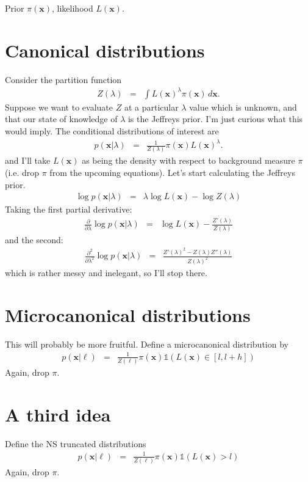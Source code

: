 \documentclass[a4paper, 11pt]{article}
\newcommand{\xx}{\boldsymbol{x}}	%
\begin{document}
Prior $\pi(\xx)$, likelihood $L(\xx)$.

\section{Canonical distributions}
Consider the partition function
\begin{eqnarray}
Z(\lambda) &=& \int L(\xx)^\lambda \pi(\xx) \, d\xx.
\end{eqnarray}
Suppose we want to evaluate $Z$ at a particular $\lambda$ value which is
unknown, and that our state of knowledge of $\lambda$ is the Jeffreys prior.
I'm just curious what this would imply. The conditional distributions of
interest are
\begin{eqnarray}
p(\xx | \lambda) &=& \frac{1}{Z(\lambda)}\pi(\xx)L(\xx)^\lambda.
\end{eqnarray}
and I'll take $L(\xx)$ as being the density with respect to background measure
$\pi$ (i.e. drop $\pi$ from the upcoming equations).
Let's start calculating the Jeffreys prior.
\begin{eqnarray}
\log p(\xx | \lambda) &=&  \lambda \log L(\xx) - \log Z(\lambda)
\end{eqnarray}
Taking the first partial derivative:
\begin{eqnarray}
\frac{\partial}{\partial \lambda}
\log p(\xx | \lambda) &=& \log L(\xx) - \frac{Z'(\lambda)}{Z(\lambda)}
\end{eqnarray}
and the second:
\begin{eqnarray}
\frac{\partial^2}{\partial \lambda^2}
\log p(\xx | \lambda) &=& \frac{Z'(\lambda)^2 - Z(\lambda)Z''(\lambda)}{Z(\lambda)^2}
\end{eqnarray}
which is rather messy and inelegant, so I'll stop there.

\section{Microcanonical distributions}
This will probably be more fruitful. Define a microcanonical distribution by
\begin{eqnarray}
p(\xx | \ell) &=& \frac{1}{Z(\ell)}\pi(\xx)\mathds{1}
\left(L(\xx) \in [l, l + h]\right)
\end{eqnarray}
Again, drop $\pi$. 


\section{A third idea}
Define the NS truncated distributions
\begin{eqnarray}
p(\xx | \ell) &=& \frac{1}{Z(\ell)}\pi(\xx)\mathds{1}
\left(L(\xx) > l\right)
\end{eqnarray}
Again, drop $\pi$. 
\end{document}

